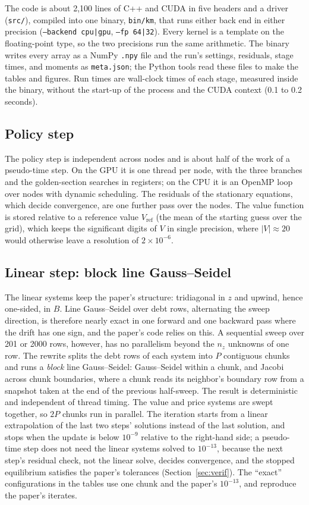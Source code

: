 \documentclass[11pt]{article}
\begin{document}
The code is about 2{,}100 lines of C++ and CUDA in five headers and a driver (\texttt{src/}), compiled into one binary, \texttt{bin/km}, that runs either back end in either precision (\texttt{--backend cpu|gpu}, \texttt{--fp 64|32}). Every kernel is a template on the floating-point type, so the two precisions run the same arithmetic. The binary writes every array as a NumPy \texttt{.npy} file and the run's settings, residuals, stage times, and moments as \texttt{meta.json}; the Python tools read these files to make the tables and figures. Run times are wall-clock times of each stage, measured inside the binary, without the start-up of the process and the CUDA context (0.1 to 0.2 seconds).

\subsection{Policy step}
The policy step is independent across nodes and is about half of the work of a pseudo-time step. On the GPU it is one thread per node, with the three branches and the golden-section searches in registers; on the CPU it is an OpenMP loop over nodes with dynamic scheduling. The residuals of the stationary equations, which decide convergence, are one further pass over the nodes. The value function is stored relative to a reference value $V_{\mathrm{ref}}$ (the mean of the starting guess over the grid), which keeps the significant digits of $V$ in single precision, where $|V|\approx 20$ would otherwise leave a resolution of $2\times10^{-6}$.

\subsection{Linear step: block line Gauss--Seidel}
The linear systems keep the paper's structure: tridiagonal in $z$ and upwind, hence one-sided, in $B$. Line Gauss--Seidel over debt rows, alternating the sweep direction, is therefore nearly exact in one forward and one backward pass where the drift has one sign, and the paper's code relies on this. A sequential sweep over 201 or 2000 rows, however, has no parallelism beyond the $n_z$ unknowns of one row. The rewrite splits the debt rows of each system into $P$ contiguous chunks and runs a \emph{block} line Gauss--Seidel: Gauss--Seidel within a chunk, and Jacobi across chunk boundaries, where a chunk reads its neighbor's boundary row from a snapshot taken at the end of the previous half-sweep. The result is deterministic and independent of thread timing. The value and price systems are swept together, so $2P$ chunks run in parallel. The iteration starts from a linear extrapolation of the last two steps' solutions instead of the last solution, and stops when the update is below $10^{-9}$ relative to the right-hand side; a pseudo-time step does not need the linear systems solved to $10^{-13}$, because the next step's residual check, not the linear solve, decides convergence, and the stopped equilibrium satisfies the paper's tolerances (Section~\ref{sec:verif}). The ``exact'' configurations in the tables use one chunk and the paper's $10^{-13}$, and reproduce the paper's iterates.
\end{document}
